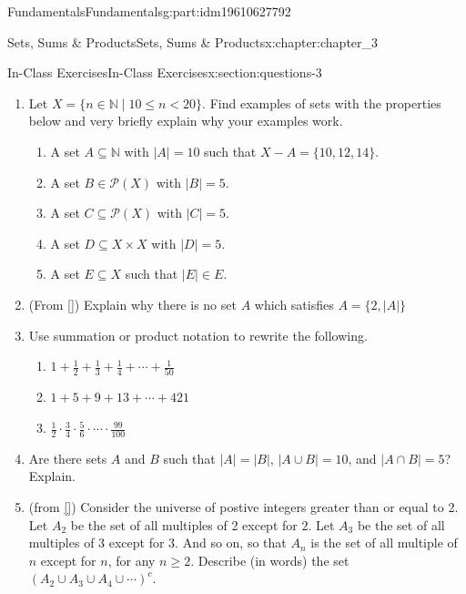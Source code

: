 \documentclass[oneside,10pt,]{book}
\newcommand{\xreffont}{\relax}
\numberwithin{equation}{section}
\newcommand{\card}[1]{\left| #1 \right|}
\newcommand{\lt}{<}
\begin{document}
\begin{partptx}{Fundamentals}{}{Fundamentals}{}{}{g:part:idm19610627792}
\begin{chapterptx}{Sets, Sums \& Products}{}{Sets, Sums \& Products}{}{}{x:chapter:chapter_3}
\typeout{************************************************}
%
\begin{sectionptx}{In-Class Exercises}{}{In-Class Exercises}{}{}{x:section:questions-3}
%
\begin{enumerate}[label=\arabic*.]
\item{}Let \(X = \{n \in \mathbb{N} \mid 10 \leq n \lt 20\}\).  Find examples of sets with the properties below and very briefly explain why your examples work.%
\begin{enumerate}[label=(\alph*)]
\item{}A set \(A \subseteq \mathbb{N}\) with \(\lvert A \rvert = 10\) such that \(X - A = \{10, 12, 14\}\).%
\item{}A set \(B \in \mathcal{P}(X)\) with \(\lvert B\rvert = 5\).%
\item{}A set \(C \subseteq \mathcal{P}(X)\) with \(\lvert C\rvert = 5\).%
\item{}A set \(D \subseteq X \times X\) with \(\lvert D\rvert = 5\).%
\item{}A set \(E \subseteq X\) such that \(\lvert E\rvert \in E\).%
\end{enumerate}
%
\item{}(From \hyperlink{x:biblio:biblio-levin-2020}{[{\xreffont 3}]}) Explain why there is no set \(A\) which satisfies \(A = \{2, \card{A}\}\)%
\item{}Use summation or product notation to rewrite the following.%
\begin{enumerate}[label=(\alph*)]
\item{}\(\displaystyle 1 + \frac{1}{2} + \frac{1}{3}+ \frac{1}{4}+ \cdots + \frac{1}{50}\)%
\item{}\(\displaystyle 1 + 5 + 9 + 13 + \cdots + 421\)%
\item{}\(\displaystyle \frac{1}{2}\cdot \frac{3}{4}\cdot \frac{5}{6}\cdot \cdots 			 
\cdot\frac{99}{100}\)%
\end{enumerate}
%
\item{}Are there sets \(A\) and \(B\) such that \(|A| = |B|\), \(|A\cup B| = 10\), and \(|A\cap B| = 5\)?  Explain.%
\item{}(from \hyperlink{x:biblio:biblio-levin-2020}{[{\xreffont 3}]}) Consider the universe of postive integers greater than or equal to 2. Let \(A_2\) be the set of all multiples of 2 except for \(2\). Let \(A_3\) be the set of all multiples of 3 except for 3. And so on, so that \(A_n\) is the set of all multiple of \(n\) except for \(n\), for any \(n \ge 2\). Describe (in words) the set \(\left(A_2 \cup A_3 \cup A_4 \cup \cdots \right)^c\).%

\end{enumerate}
\end{sectionptx}
\end{chapterptx}
\end{partptx}
\end{document}
